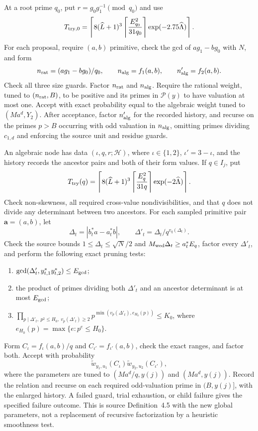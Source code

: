 At a root prime $q_0$, put $r=g_0g_1^{-1}\pmod{q_0}$ and use
\[
 T_{\rm try,0}=\left\lceil
 8(\widehat L+1)^3\left\lceil\frac{E_{q_0}^2}{31q_0}\right\rceil
       \exp(-2.75\widehat\Lambda)\right\rceil.
\]
For each proposal, require $(a,b)$ primitive, check the gcd of
$ag_1-bg_0$ with $N$, and form
\[
 n_{\rm rat}=(ag_1-bg_0)/q_0,\qquad
 n_{
 \rm alg}=f_1(a,b),\qquad n'_{
 \rm alg}=f_2(a,b).
\]
Check all three size guards.  Factor $n_{\rm rat}$ and $n_{\rm alg}$.
Require the rational weight, tuned to $(n_{\rm rat},B)$, to be
positive and its primes in $\mathcal P(y)$ to have valuation at most
one.  Accept with exact probability equal to the algebraic weight
tuned to $(Ma^d,Y_2)$.  After acceptance, factor $n'_{\rm alg}$ for
the recorded history, and recurse on the primes $p>B$ occurring
with odd valuation in $n_{\rm alg}$, omitting primes dividing
$c_{1,d}$ and enforcing the source unit and residue guards.

An algebraic node has data $(\iota,q,r;\mathcal H)$, where
$\iota\in\{1,2\}$, $\iota'=3-\iota$, and the history records the
ancestor pairs and both of their form values.  If $q\in I_j$, put
\[
 T_{\rm try}(q)=\left\lceil
 8(\widehat L+1)^3\left\lceil\frac{E_q^2}{31q}\right\rceil
             \exp(-2\widehat\Lambda)\right\rceil.
\]
Check non-skewness, all required cross-value nondivisibilities,
and that $q$ does not divide any determinant between two ancestors.
For each sampled primitive pair $\boldsymbol a=(a,b)$, let
\[
 \Delta_t=|b_t^*a-a_t^*b|,\qquad
 \Delta'_t=\Delta_t/q^{v_q(\Delta_t)}.
\]
Check the source bounds $1\le\Delta_t\le\sqrt N/2$ and
$M_{\rm wed}\Delta_t\ge a_t^*E_q$, factor every $\Delta'_t$, and
perform the following exact pruning tests:
\begin{enumerate}[label=\textup{(\roman*)},leftmargin=*]
\item $\gcd(\Delta'_t,y_{t,1}^*y_{t,2}^*)\le E_{\rm gcd}$;
\item the product of primes dividing both $\Delta'_t$ and an
ancestor determinant is at most $E_{\rm gcd}$;
\item
$\prod_{p\mid\Delta'_t,\ p^2\le H_0,\ v_p(\Delta'_t)\ge2}
 p^{\min(v_p(\Delta'_t),e_{H_0}(p))}\le K_0$,
where $e_{H_0}(p)=\max\{e:p^e\le H_0\}$.
\end{enumerate}
Form $C_\iota=f_\iota(a,b)/q$ and
$C_{\iota'}=f_{\iota'}(a,b)$, check the exact ranges, and factor
both.  Accept with probability
\[
 \widetilde w_{y_1,u_1}(C_\iota)
 \widetilde w_{y_2,u_2}(C_{\iota'}),
\]
where the parameters are tuned to $(Ma^d/q,y(j))$ and
$(Ma^d,y(j))$.  Record the relation and recurse on each required
odd-valuation prime in $(B,y(j)]$, with the enlarged history.
A failed guard, trial exhaustion, or child failure gives the specified
failure outcome.  This is source Definition~4.5 with the new global
parameters, not a replacement of recursive factorization by a
heuristic smoothness test.

